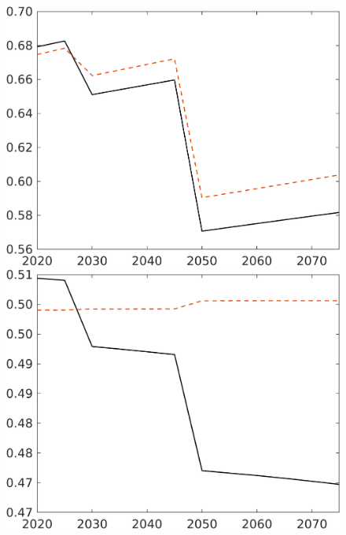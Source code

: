 \begin{figure}[h!!]
\begin{minipage}[]{0.32\textwidth}
	\end{minipage}
	\begin{minipage}[]{0.32\textwidth}
		\includegraphics[width=1\textwidth]{../../codding_model/own_basedOnFried/optimalPol_elastS_DisuSci/figures/all_1705/comp_notaul_OPT_T_NoTaus_C_spillover0_sep1_BN0_ineq0_red0_etaa0.79_lgd0.png}
	\end{minipage}
	\begin{minipage}[]{0.32\textwidth}
		\includegraphics[width=1\textwidth]{../../codding_model/own_basedOnFried/optimalPol_elastS_DisuSci/figures/all_1705/comp_notaul_OPT_T_NoTaus_hh_spillover0_sep1_BN0_ineq0_etaa0.79.png}

\end{minipage}
\end{figure}
